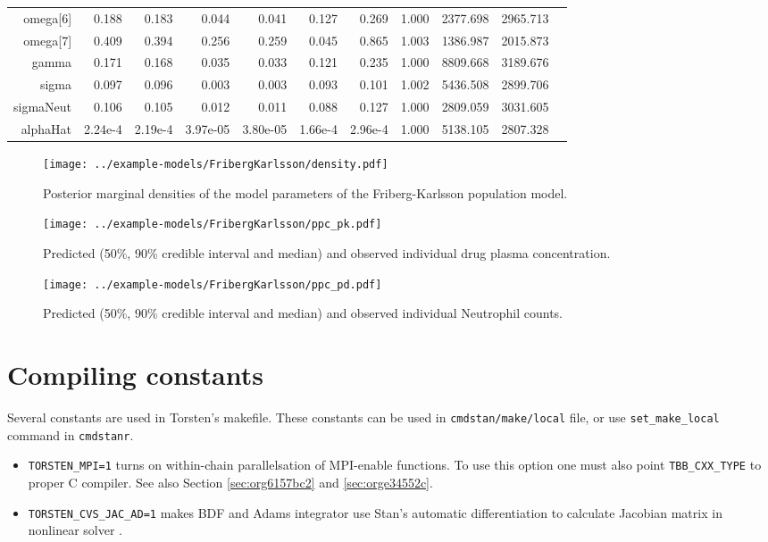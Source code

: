 \documentclass[12pt, reqno, oneside]{amsbook}
\numberwithin{equation}{chapter}
\numberwithin{figure}{chapter}
\numberwithin{table}{chapter}
\theoremstyle{remark}
\begin{document}
\begin{table}[htbp]
\begin{tabular}{r r r r r r r r r r r}
omega[6] & 0.188 & 0.183 & 0.044 & 0.041 & 0.127 & 0.269 & 1.000 & 2377.698 & 2965.713\\
omega[7] & 0.409 & 0.394 & 0.256 & 0.259 & 0.045 & 0.865 & 1.003 & 1386.987 & 2015.873\\
gamma & 0.171 & 0.168 & 0.035 & 0.033 & 0.121 & 0.235 & 1.000 & 8809.668 & 3189.676\\
sigma & 0.097 & 0.096 & 0.003 & 0.003 & 0.093 & 0.101 & 1.002 & 5436.508 & 2899.706\\
sigmaNeut & 0.106 & 0.105 & 0.012 & 0.011 & 0.088 & 0.127 & 1.000 & 2809.059 & 3031.605\\
alphaHat & 2.24e-4 & 2.19e-4 & 3.97e-05 & 3.80e-05 & 1.66e-4 & 2.96e-4 & 1.000 & 5138.105 & 2807.328\\
\end{tabular}
\end{table}

\begin{figure}[htbp]
\centering
\texttt{[image: ../example-models/FribergKarlsson/density.pdf]}
\caption{\label{fkpop_mcmc_density}Posterior marginal densities of the model parameters of the Friberg-Karlsson population model.}
\end{figure}

\begin{figure}[htbp]
\centering
\texttt{[image: ../example-models/FribergKarlsson/ppc\_pk.pdf]}
\caption{\label{fkpop_ppc_pk}Predicted (50\%, 90\% credible interval and median) and observed individual drug plasma concentration.}
\end{figure}

\begin{figure}[htbp]
\centering
\texttt{[image: ../example-models/FribergKarlsson/ppc\_pd.pdf]}
\caption{\label{fkpop_ppc_pd}Predicted (50\%, 90\% credible interval and median) and observed individual Neutrophil counts.}
\end{figure}

\appendix
\chapter*{Compiling constants}
\label{sec:org9e915c4}
Several constants are used in Torsten's makefile. These constants can
be used in \texttt{cmdstan/make/local} file, or use \texttt{set\_make\_local} command
in \texttt{cmdstanr}.
\begin{itemize}
\item \texttt{TORSTEN\_MPI=1} turns on within-chain parallelsation of MPI-enable
functions. To use this option one must also point
\texttt{TBB\_CXX\_TYPE} to proper C compiler. See also Section \ref{sec:org6157bc2} and \ref{sec:orge34552c}.
\item \texttt{TORSTEN\_CVS\_JAC\_AD=1} makes BDF and Adams
integrator use Stan's automatic differentiation to calculate
Jacobian matrix in nonlinear solver \cite{hindmarsh_cvodes_2020}.
\end{itemize}

\printindex

\backmatter

\label{bibliographystyle link}


\label{bibliography link}

\end{document}
